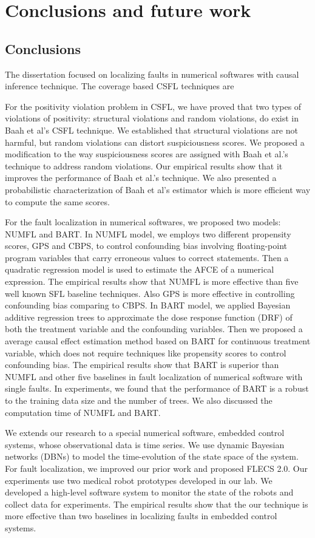 \chapter{Conclusions and future work}\label{conclusion}
\section{Conclusions}
The dissertation focused on localizing faults in numerical softwares with causal inference technique.  The coverage based CSFL techniques are  

For the positivity violation problem in CSFL, we have proved that two types of violations of positivity: structural violations and random violations, do exist in Baah et al’s CSFL technique. We established that structural violations are not harmful, but random violations can distort suspiciousness scores.  We proposed a modification to the way suspiciousness scores are assigned with Baah et al.’s technique to address random violations.  Our empirical results show that it improves the performance of Baah et al.’s technique. We also presented a probabilistic characterization of Baah et al’s estimator which is more efficient way to compute the same scores. 

For the fault localization in numerical softwares, we proposed two models: NUMFL and BART.  In NUMFL model, we employs two different propensity scores, GPS and CBPS, to control confounding bias involving floating-point program variables that carry erroneous values to correct statements.  Then a quadratic regression model is used to estimate the AFCE of a numerical expression. The empirical results show that NUMFL is more effective than five well known SFL baseline techniques. Also GPS is more effective in controlling confounding bias comparing to CBPS. In BART model, we applied Bayesian additive regression trees to approximate the dose response function (DRF) of both the treatment variable and the confounding variables. Then we proposed a average causal effect estimation method based on BART for continuous treatment variable, which does not require techniques like propensity scores to control confounding bias. The empirical results show that BART is superior than NUMFL and other five baselines in fault localization of numerical software with single faults. In experiments, we found that the performance of BART is a robust to the training data size and the number of trees. We also discussed the computation time of NUMFL and BART. 

We extends our research to a special numerical software, embedded control systems, whose observational data is time series. We use dynamic Bayesian networks (DBNs) to model the time-evolution of the state space of the system. For fault localization, we improved our prior work and proposed FLECS 2.0. Our experiments use two medical robot prototypes developed in our lab. We developed a high-level software system to monitor the state of the robots and collect data for experiments. The empirical results show that the our technique is more effective than two baselines in localizing faults in embedded control systems.

